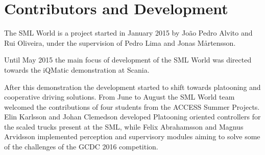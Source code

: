 
\section{Contributors and Development}
\label{sec:Contributors}

The SML World is a project started in January 2015 by João Pedro Alvito and Rui Oliveira, under the supervision of Pedro Lima and Jonas Mårtensson.

Until May 2015 the main focus of development of the SML World was directed towards the iQMatic demonstration at Scania.

After this demonstration the development started to shift towards platooning and cooperative driving solutions. From June to August the SML World team welcomed the contributions of four students from the ACCESS Summer Projects. Elin Karlsson and Johan Clemedson developed Platooning oriented controllers for the scaled trucks present at the SML, while Felix Abrahamsson and Magnus Arvidsson implemented perception and supervisory modules aiming to solve some of the challenges of the GCDC 2016 competition.


